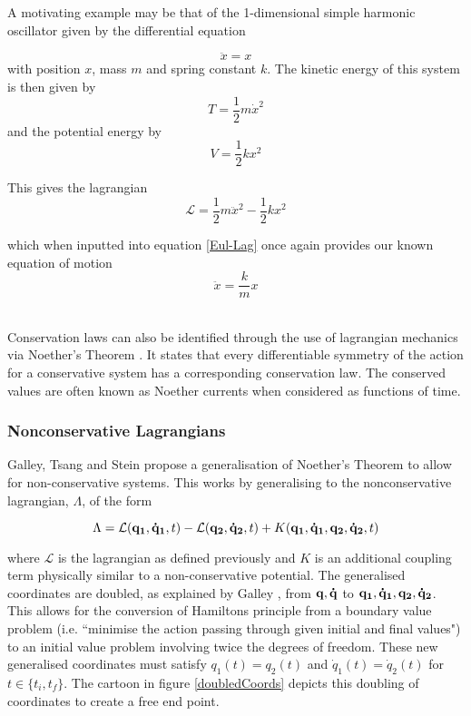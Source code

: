 \documentclass[10pt]{iopart}
\begin{document}
A motivating example may be that of the 1-dimensional simple harmonic oscillator given by the differential equation

\begin{equation}
	\ddot x = x
\end{equation}
with position $x$, mass $m$ and spring constant $k$. The kinetic energy of this system is then given by
\begin{equation}
	T = \frac{1}{2}m\dot x^2
\end{equation}
and the potential energy by 
\begin{equation}
	V = \frac{1}{2}kx^2
\end{equation}

\noindent This gives the lagrangian
\begin{equation}
	\mathcal{L} = \frac{1}{2}m\ddot x^2 - \frac{1}{2}kx^2
\end{equation}

\noindent which when inputted into equation \ref{Eul-Lag} once again provides our known equation of motion
\begin{equation}
	\ddot x = \frac{k}{m}x
\end{equation}\

Conservation laws can also be identified through the use of lagrangian mechanics via Noether's Theorem \cite{Goldstein}. It states that every differentiable symmetry of the action for a conservative system has a corresponding conservation law. The conserved values are often known as Noether currents when considered as functions of time. 

\subsubsection{Nonconservative Lagrangians \\}
Galley, Tsang and Stein \cite{GalleyEtAl} propose a generalisation of Noether's Theorem to allow for non-conservative systems. This works by generalising to the nonconservative lagrangian, $\Lambda$, of the form 

\begin{equation}
\label{non-con-lagran}
	\Lambda = \mathcal{L}(\bold{q_1,\dot q_1},t) - \mathcal{L}(\bold{q_2,\dot q_2},t) + K(\bold{q_1,\dot q_1,q_2,\dot q_2},t)
\end{equation}

where $\mathcal{L}$ is the lagrangian as defined previously and $K$ is an additional coupling term physically similar to a non-conservative potential. The generalised coordinates are doubled, as explained by Galley \cite{Galley}, from $\bold{q,\dot q}$ to $\bold{q_1,\dot q_1, q_2, \dot q_2}$. This allows for the conversion of Hamiltons principle from a boundary value problem (i.e. ``minimise the action passing through given initial and final values") to an initial value problem involving twice the degrees of freedom. These new generalised coordinates must satisfy $q_1(t) = q_2(t)$ and $\dot q_1(t) = \dot q_2(t)$ for $t \in \{t_i, t_f\}$. The cartoon in figure \ref{doubledCoords} depicts this doubling of coordinates to create a free end point.
\end{document}
